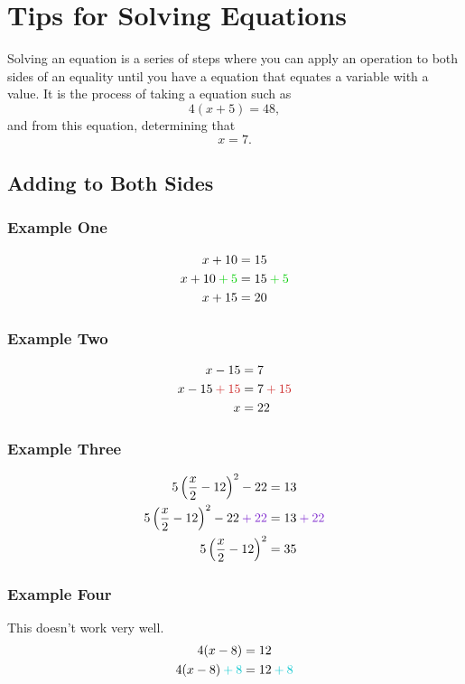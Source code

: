 \documentclass[a4paper,12pt]{article}
\begin{document}
\section*{Tips for Solving Equations}
Solving an equation is a series of steps where you can apply an
operation to both sides of an equality until you have a 
equation that equates a variable with a value. It is the process
of taking a equation such as
$$4(x + 5) = 48,$$
and from this equation, determining that
$$x = 7.$$

\subsection*{Adding to Both Sides}

\subsubsection*{Example One}

\begin{align*}
x + 10  &=  15 \\
x + 10 \color{Green3} + 5\color{black}  &=  15 \color{Green3} + 5 \color{black} \\
x + 15  &=  20
\end{align*}

\subsubsection*{Example Two}

\begin{align*}
x - 15  &=  7 \\
x - 15 \color{Firebrick3} + 15 \color{black}  &=  7 \color{Firebrick3} + 15\color{black} \\
x  &=  22
\end{align*}

\subsubsection*{Example Three}

\begin{align*}
5\left(\frac{x}{2}-12\right)^2 - 22  &=  13 \\
5\left(\frac{x}{2}-12\right)^2 - 22 \color{Purple3} + 22\color{black} &= 13\color{Purple3} + 22\color{black} \\
5\left(\frac{x}{2}-12\right)^2 &= 35
\end{align*}

\subsubsection*{Example Four}

This doesn't work very well.
\begin{align*}
4(x - 8)  &=  12 \\
4(x - 8) \color{Turquoise3}+ 8\color{black}  &=  12 \color{Turquoise3}+ 8\color{black} \\
\end{align*}
\end{document}
